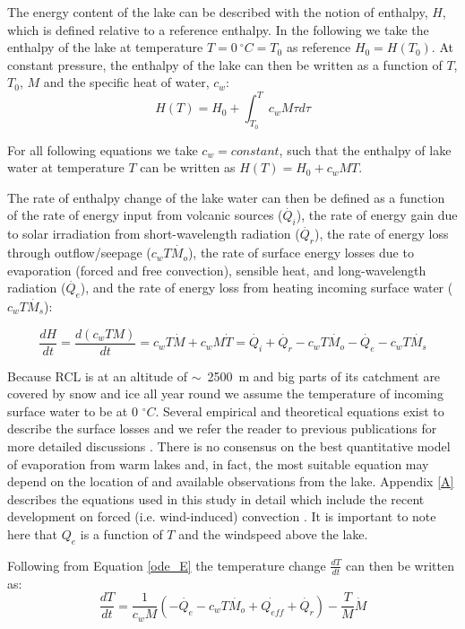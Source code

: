 \documentclass[doublespacing]{bmcart}
\begin{document}
The energy content of the lake can be described with the notion of enthalpy,
$H$, which is defined relative to a reference enthalpy. In the following we take
the enthalpy of the lake at temperature $T=0~^{\circ}C=T_0$ as reference
$H_0=H(T_0)$. At constant pressure, the enthalpy of the lake can then be written
as a function of $T$, $T_0$, $M$ and the specific heat of water, $c_w$:
\begin{equation}
	H(T) = H_0 + \int_{T_0}^{T}c_wM\tau d\tau
\end{equation}

For all following equations we take $c_w=constant$, such that the enthalpy of
lake water at temperature $T$ can be written as $H(T) = H_0 + c_wMT$.

The rate of enthalpy change of the lake water can then be defined as a function
of the rate of energy input from volcanic sources ($\dot{Q_i}$), the rate of
energy gain due to solar irradiation from short-wavelength radiation
($\dot{Q_r}$), the rate of energy loss through outflow/seepage
($c_wT\dot{M_o}$), the rate of surface energy losses due to evaporation (forced
and free convection), sensible heat, and long-wavelength radiation
($\dot{Q_e}$), and the rate of energy loss from heating incoming surface water
($c_wT\dot{M_s}$): 

\begin{equation}\label{ode_E}
    \frac{dH}{dt}=\frac{d(c_wTM)}{dt}=c_wT\dot{M} + c_wM\dot{T} =
	\dot{Q_i} + \dot{Q_r} - c_wT\dot{M_o} - \dot{Q_e} - c_wT\dot{M_s} 
\end{equation}
      
Because RCL is at an altitude of $\sim$~2500~m and big parts of its catchment
are covered by snow and ice all year round we assume the temperature of incoming
surface water to be at 0 $^{\circ}C$. Several empirical and theoretical equations exist
to describe the surface losses and we refer the reader to previous publications
for more detailed discussions \cite{Stevenson1992, hurstCraterLakeEnergy2015}.
There is no consensus on the best quantitative model of evaporation from warm
lakes and, in fact, the most suitable equation may depend on the location of and
available observations from the lake. Appendix \ref{A} describes the equations
used in this study in detail which include the recent development on forced
(i.e. wind-induced) convection \cite{sartoriCriticalReviewEquations2000}. It is
important to note here that $Q_e$ is a function of $T$ and the windspeed above
the lake. 

Following from Equation \ref{ode_E} the temperature change $\frac{dT}{dt}$ can
then be written as:
\begin{equation}\label{ode_T}
	\frac{dT}{dt}=\frac{1}{c_wM}\left(-\dot{Q_e} - c_wT\dot{M_o} + \dot{Q_{eff}} + \dot{Q_r}\right )
	-\frac{T}{M}\dot{M}
\end{equation}
\end{document}
